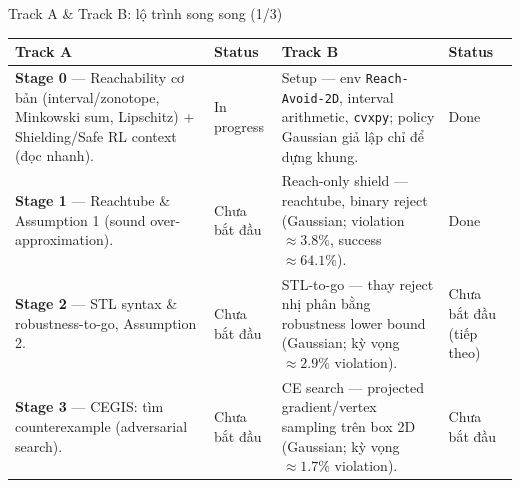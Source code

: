 \documentclass[aspectratio=169]{beamer}
\newcommand{\good}[1]{\textcolor{green!40!black}{#1}}
\begin{document}
\begin{frame}[t,shrink=8]{Track A \& Track B: lộ trình song song (1/3)}
\footnotesize
\begin{tabularx}{\textwidth}{|>{\raggedright\arraybackslash}p{}|>{\centering\arraybackslash}p{}|>{\raggedright\arraybackslash}p{}|>{\centering\arraybackslash}p{}|}
\hline
\textbf{Track A} & \textbf{Status} & \textbf{Track B} & \textbf{Status} \\
\hline
\textbf{Stage 0} --- Reachability cơ bản (interval/zonotope, Minkowski sum, Lipschitz) + Shielding/Safe RL context (đọc nhanh). &
In progress &
Setup --- env \texttt{Reach-Avoid-2D}, interval arithmetic, \texttt{cvxpy}; policy Gaussian giả lập chỉ để dựng khung. &
\good{Done} \\
\hline
\textbf{Stage 1} --- Reachtube \& Assumption 1 (sound over-approximation). &
Chưa bắt đầu &
Reach-only shield --- reachtube, binary reject (Gaussian; violation $\approx3.8\%$, success $\approx64.1\%$). &
\good{Done} \\
\hline
\textbf{Stage 2} --- STL syntax \& robustness-to-go, Assumption 2. &
Chưa bắt đầu &
STL-to-go --- thay reject nhị phân bằng robustness lower bound (Gaussian; kỳ vọng $\approx2.9\%$ violation). &
Chưa bắt đầu (tiếp theo) \\
\hline
\textbf{Stage 3} --- CEGIS: tìm counterexample (adversarial search). &
Chưa bắt đầu &
CE search --- projected gradient/vertex sampling trên box 2D (Gaussian; kỳ vọng $\approx1.7\%$ violation). &
Chưa bắt đầu \\
\hline
\end{tabularx}
\end{frame}
\end{document}
